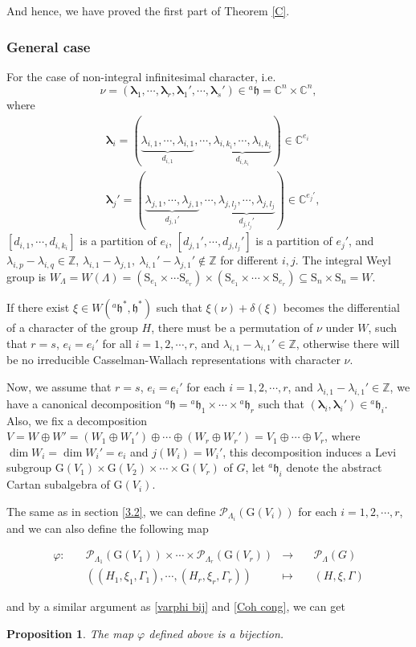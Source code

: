 \documentclass[12pt, a4paper]{amsart}
\numberwithin{equation}{section}
\newtheorem{prop}[thm]{Proposition}
\newcommand{\blam}{{\boldsymbol{\lambda}}}
\newcommand{\BC}{{\mathbb {C}}}
\newcommand{\BZ}{{\mathbb {Z}}}
\newcommand{\CP}{{\mathcal {P}}}
\newcommand{\fh}{\mathfrak{h}}
\newcommand{\G}{{\mathrm{G}}}
\newcommand{\defmap}[5]{
           \begin{equation*}
              \begin{aligned}
                   #1:\quad  & #2 &\longrightarrow &\quad #3 \\
                      \quad  & #4    &\longmapsto  &\quad #5
              \end{aligned}
           \end{equation*}
          }
\begin{document}
And hence, we have proved the first part of Theorem \ref{C}.

\subsubsection{General case}
For the case of non-integral infinitesimal character, i.e. 
$$\nu = (\blam_1, \cdots, \blam_r, \blam_1',\cdots, \blam_s') \in {^{a}\fh} = \BC^n \times \BC^n,$$ 
where 
\begin{align}
    &\blam_i = (\underbrace{\lambda_{i,1}, \cdots,\lambda_{i,1}}_{d_{i,1}},\cdots,\underbrace{\lambda_{i,k_i},\cdots,\lambda_{i,k_i}}_{d_{i,k_i}}) \in \BC^{e_i}\\
    &\blam_j' = (\underbrace{\lambda_{j,1},\cdots,\lambda_{j,1}}_{d_{j,1}'}, \cdots ,\underbrace{\lambda_{j,l_j},\cdots, \lambda_{j,l_j}}_{d_{j,l_j}'}) \in \BC^{e_j'},
\end{align}
 $[d_{i,1} , \cdots , d_{i,k_i}]$ is a partition of $e_i$, $[d_{j,1}', \cdots , d_{j,l_j}']$ is a partition of $e_j'$, and $\lambda_{i,p} - \lambda_{i,q} \in \BZ$, $\lambda_{i,1} - \lambda_{j,1}, \ \lambda_{i,1}' - \lambda_{j,1}' \notin \BZ$ for different $i,j$. The integral Weyl group is $W_\Lambda = W(\Lambda) = (\mathrm{S}_{e_1} \times \cdots \mathrm{S}_{e_r}) \times (\mathrm{S}_{e_1} \times \cdots \times \mathrm{S}_{e_r}) \subseteq \mathrm{S}_n \times \mathrm{S}_n = W$.

If there exist $\xi \in W({^{a}\fh^*},\fh^*)$ such that $\xi(\nu) + \delta(\xi)$ becomes the differential of a character of the group $H$, there must be a permutation of $\nu$ under $W$, such that $r = s$, $e_i = e_i'$ for all $i = 1,2,\cdots,r$, and $\lambda_{i,1} - \lambda_{i,1}' \in \BZ$, otherwise there will be no irreducible Casselman-Wallach representations with character $\nu$.

Now, we assume that $r = s$, $e_i = e_i'$ for each $i =1,2,\cdots,r$, and $\lambda_{i,1} - \lambda_{i,1}' \in \BZ$, we have a canonical decomposition $^{a}\fh = {^{a}\fh_1} \times \cdots \times {^{a}\fh_r}$ such that $(\blam_i, \blam_i')\in {^{a}\fh_i}$. Also, we fix a decomposition $V = W \oplus W' = (W_1 \oplus W_1') \oplus \cdots \oplus (W_r \oplus W_r') = V_1 \oplus \cdots \oplus V_r$, where $\dim W_i = \dim W_i' = e_i$ and $j(W_i) = W_i'$, this decomposition induces a Levi subgroup $\G(V_1) \times \G (V_2) \times \cdots \times \G(V_r)$ of $G$, let $^{a}\fh_i$ denote the abstract Cartan subalgebra of $\G(V_i)$. 

The same as in section \ref{3.2}, we can define $\CP_{\Lambda_i}(\G(V_i))$ for each $i = 1,2,\cdots,r$, and we can also define the following map
\defmap{\varphi}{\CP_{\Lambda_1}(\G(V_1))\times \cdots \times \CP_{\Lambda_r}(\G(V_r))}{\CP_{\Lambda}(G)}{((H_1,\xi_1,\Gamma_1),\cdots , (H_r,\xi_r,\Gamma_r))}{(H,\xi,\Gamma)}
and by a similar argument as \ref{varphi bij} and \ref{Coh cong}, we can get
\begin{prop}
    The map $\varphi$ defined above is a bijection.
\end{prop}
\end{document}
